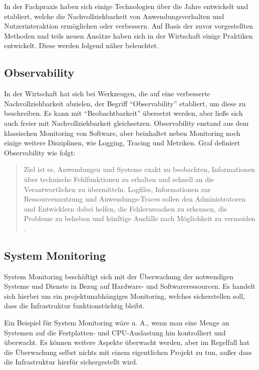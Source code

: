 In der Fachpraxis haben sich einige Technologien über die Jahre entwickelt und etabliert, welche die Nachvollziehbarkeit von Anwendungsverhalten und Nutzerinteraktion ermöglichen oder verbessern. Auf Basis der zuvor vorgestellten Methoden und teils neuen Ansätze haben sich in der Wirtschaft einige Praktiken entwickelt. Diese werden folgend näher beleuchtet.

\subsection{Observability}

In der Wirtschaft hat sich bei Werkzeugen, die auf eine verbesserte Nachvollziehbarkeit abzielen, der Begriff \enquote{Observability} etabliert,    um diese zu beschreiben. Es kann mit \enquote{Beobachtbarkeit} übersetzt werden, aber ließe sich auch freier mit Nachvollziehbarkeit gleichsetzen. Observability enstand aus dem klassischen Monitoring von Software, aber beinhaltet neben Monitoring noch einige weitere Disziplinen, wie Logging, Tracing und Metriken. Graf \cite{MichaelGrafBA} definiert Observability wie folgt:


\begin{quotation}
Ziel ist es, Anwendungen und Systeme exakt zu beobachten, Informationen über technische Fehlfunktionen zu erhalten und schnell an die Verantwortlichen zu übermitteln. Logfiles, Informationen zur Ressourcennutzung und Anwendungs-Traces sollen den Administratoren und Entwicklern dabei helfen, die Fehlerursachen zu erkennen, die Probleme zu beheben und künftige Ausfälle nach Möglichkeit zu vermeiden \cite{DistributedSystemsObservability}.
\end{quotation}

\subsection{System Monitoring}

System Monitoring beschäftigt sich mit der Überwachung der notwendigen Systeme und Dienste in Bezug auf Hardware- und Softwareressourcen. Es handelt sich hierbei um ein projektunabhängiges Monitoring, welches sicherstellen soll, dass die Infrastruktur funktionstüchtig bleibt.

Ein Beispiel für System Monitoring wäre u. A., wenn man eine Menge an Systemen auf die Festplatten- und CPU-Auslastung hin kontrolliert und überwacht. Es können weitere Aspekte überwacht werden, aber im Regelfall hat die Überwachung selbst nichts mit einem eigentlichen Projekt zu tun, außer dass die Infrastruktur hierfür sichergestellt wird.

